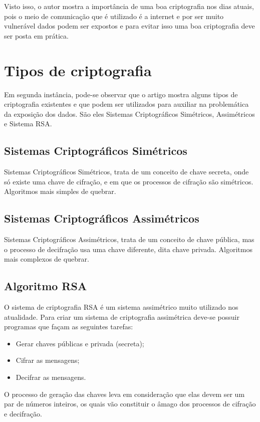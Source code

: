 \documentclass[12pt]{article}
\begin{document}
Visto isso, o autor mostra a importância de uma boa criptografia nos dias atuais, pois o meio de comunicação que é utilizado é a internet e por ser muito vulnerável dados podem ser expostos e para evitar isso uma boa criptografia deve ser posta em prática.

\section{Tipos de criptografia}
Em segunda instância, pode-se observar que o artigo mostra alguns tipos de criptografia existentes e que podem ser utilizados para auxiliar na problemática da exposição dos dados. São eles Sistemas Criptográficos Simétricos, Assimétricos e Sistema RSA.
\subsection{Sistemas Criptográficos Simétricos}
Sistemas Criptográficos Simétricos, trata de um conceito de chave secreta, onde só existe uma chave de cifração, e em que os processos de cifração são simétricos. Algoritmos mais simples de quebrar.

\subsection{Sistemas Criptográficos Assimétricos}
Sistemas Criptográficos Assimétricos, trata de um conceito de chave pública, mas o processo de decifração usa uma chave diferente, dita chave privada. Algoritmos mais complexos de quebrar.

\subsection{Algoritmo RSA}
O sistema de criptografia RSA é um sistema assimétrico muito utilizado nos atualidade. Para criar um sistema de criptografia assimétrica deve-se possuir programas que façam as seguintes tarefas:

\begin{itemize}
  \item Gerar chaves públicas e privada (secreta);
  \item Cifrar as mensagens;
  \item Decifrar as mensagens.
\end{itemize}

O processo de geração das chaves leva em consideração que elas devem ser um par de números inteiros, os quais vão constituir o âmago dos processos de cifração e decifração.
\end{document}
